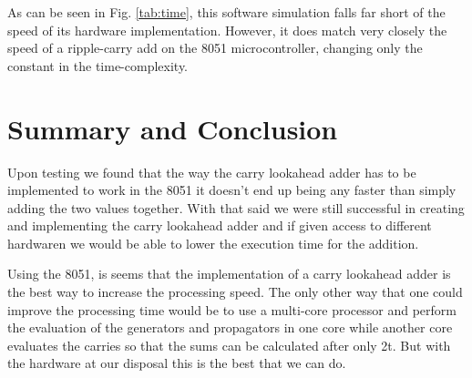 \documentclass[journal]{IEEEtran}
\begin{document}
\begin{table}
	\caption{Input Size vs Computation Time}
	\label{tab:time}
\end{table}

As can be seen in Fig. \ref{tab:time}, this software simulation falls far
short of the speed of its hardware implementation. However, it does match very
closely the speed of a ripple-carry add on the 8051 microcontroller, changing
only the constant in the time-complexity.

\section{Summary and Conclusion}

Upon testing we found that the way the carry lookahead adder has to be
implemented to work in the 8051 it doesn't end up being any faster than simply
adding the two values together. With that said we were still successful in
creating and implementing the carry lookahead adder and if given access to
different hardwaren we would be able to lower the execution time for the
addition.

Using the 8051, is seems that the implementation of a carry lookahead adder is
the best way to increase the processing speed. The only other way that one could
improve the processing time would be to use a multi-core processor and perform
the evaluation of the generators and propagators in one core while another core
evaluates the carries so that the sums can be calculated after only 2t. But with
the hardware at our disposal this is the best that we can do.
\end{document}
